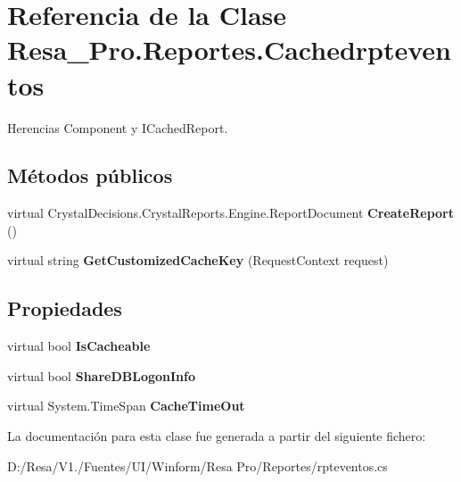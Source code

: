\section{Referencia de la Clase Resa\+\_\+\+Pro.\+Reportes.\+Cachedrpteventos}
\label{class_resa___pro_1_1_reportes_1_1_cachedrpteventos}


Herencias Component y I\+Cached\+Report.

\subsection*{Métodos públicos}
\begin{DoxyCompactItemize}
\item 
virtual Crystal\+Decisions.\+Crystal\+Reports.\+Engine.\+Report\+Document {\bfseries Create\+Report} ()\label{class_resa___pro_1_1_reportes_1_1_cachedrpteventos_aba1cdae70bc21aae93b7391e61c1d6e6}

\item 
virtual string {\bfseries Get\+Customized\+Cache\+Key} (Request\+Context request)\label{class_resa___pro_1_1_reportes_1_1_cachedrpteventos_a8e3e90252f3c8cf9915878794fb2db60}

\end{DoxyCompactItemize}
\subsection*{Propiedades}
\begin{DoxyCompactItemize}
\item 
virtual bool {\bfseries Is\+Cacheable}\hspace{0.3cm}{\ttfamily  [get, set]}\label{class_resa___pro_1_1_reportes_1_1_cachedrpteventos_ab98dc0b4716dc4d799daad2eff75c80d}

\item 
virtual bool {\bfseries Share\+D\+B\+Logon\+Info}\hspace{0.3cm}{\ttfamily  [get, set]}\label{class_resa___pro_1_1_reportes_1_1_cachedrpteventos_a0d853ef7d720b7bd559364c03410f06b}

\item 
virtual System.\+Time\+Span {\bfseries Cache\+Time\+Out}\hspace{0.3cm}{\ttfamily  [get, set]}\label{class_resa___pro_1_1_reportes_1_1_cachedrpteventos_a970e6024ac01ccfd49ca5b213c9839ad}

\end{DoxyCompactItemize}


La documentación para esta clase fue generada a partir del siguiente fichero\+:\begin{DoxyCompactItemize}
\item 
D\+:/\+Resa/\+V1./\+Fuentes/\+U\+I/\+Winform/\+Resa Pro/\+Reportes/rpteventos.\+cs\end{DoxyCompactItemize}
